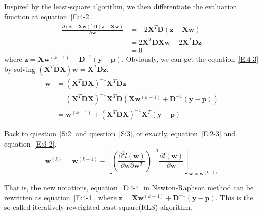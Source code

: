 \documentclass{article}
\newcommand{\vecw}{\mathbf{w}}
\newcommand{\vecy}{\mathbf{y}}
\newcommand{\vecz}{\mathbf{z}}
\newcommand{\vecp}{\mathbf{p}}
\newcommand{\matx}{\mathbf{X}}
\newcommand{\matd}{\mathbf{D}}
\newcommand{\partialdd}[2]{\frac{\partial #1}{\partial #2}}
\begin{document}
Inspired by the least-square algorithm, we then differentiate the evaluation function at equation~\eqref{E:4-2}.
\begin{equation}\label{E:4-2}
    \begin{aligned}
        \partialdd{(\vecz-\matx\vecw)^T\matd(\vecz-\matx\vecw)}{\vecw} &= -2\matx^T\matd(\vecz-\matx\vecw) \\
                                                                       &= 2\matx^T\matd\matx\vecw-2\matx^T\matd\vecz \\
                                                                       &= 0
    \end{aligned}
\end{equation}
where $\vecz=\matx\vecw^{(k-1)}+\matd^{-1}(\vecy-\vecp)$. Obviously, we can get the equation~\eqref{E:4-3} by solving $(\matx^T\matd\matx)\vecw = \matx^T\matd\vecz$.
\begin{equation}\label{E:4-3}
    \begin{aligned}
        \vecw &= (\matx^T\matd\matx)^{-1}\matx^T\matd\vecz \\
              &= (\matx^T\matd\matx)^{-1}\matx^T\matd\left(\matx\vecw^{(k-1)}+\matd^{-1}(\vecy-\vecp)\right) \\
              &= \vecw^{(k-1)}+(\matx^T\matd\matx)^{-1}\matx^T(\vecy-\vecp)
    \end{aligned}
\end{equation}

Back to question~\ref{S:2} and question~\ref{S:3}, or exactly, equation~\eqref{E:2-3} and equation~\eqref{E:3-2}.
\begin{equation}\label{E:4-4}
    \vecw^{(k)} = \vecw^{(k-1)} - \left[\left(\partialdd{^2l(\vecw)}{\vecw\partial\vecw^T}\right)^{-1}\partialdd{l(\vecw)}{\vecw}\right]_{\vecw=\vecw^{(k-1)}}
\end{equation}

That is, the new notations, equation~\eqref{E:4-4} in Newton-Raphson method can be rewritten as equation~\eqref{E:4-1}, where $\vecz=\matx\vecw^{(k-1)}+\matd^{-1}(\vecy-\vecp)$. This is the so-called iteratively reweighted least square(RLS) algorithm.

\clearpage


\end{document}
